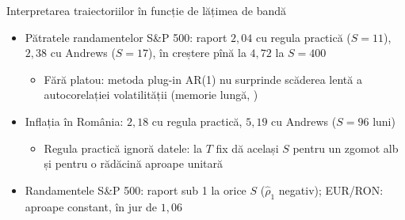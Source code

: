 \begin{frame}{Interpretarea traiectoriilor în funcție de lățimea de bandă}
\itemsize{\small}
\begin{itemize}
    \item Pătratele randamentelor S\&P 500: raport $2{,}04$ cu regula practică ($S = 11$), $2{,}38$ cu Andrews ($S = 17$), în creștere pînă la $4{,}72$ la $S = 400$
    \begin{itemize}
        \item Fără platou: metoda plug-in AR(1) nu surprinde scăderea lentă a autocorelației volatilității (memorie lungă, )
    \end{itemize}
    \item Inflația în România: $2{,}18$ cu regula practică, $5{,}19$ cu Andrews ($S = 96$ luni)
    \begin{itemize}
        \item Regula practică ignoră datele: la $T$ fix dă același $S$ pentru un zgomot alb și pentru o rădăcină aproape unitară
    \end{itemize}
    \item Randamentele S\&P 500: raport sub 1 la orice $S$ ($\hat\rho_1$ negativ); EUR/RON: aproape constant, în jur de $1{,}06$
\end{itemize}
\end{frame}

